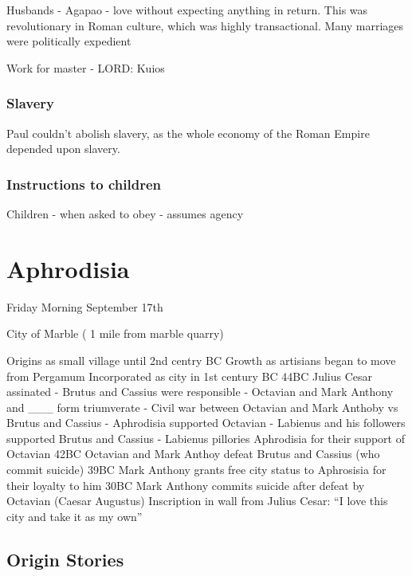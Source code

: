 \documentclass[
]{book}
\begin{document}
Husbands - Agapao - love without expecting anything in return. This was revolutionary in Roman culture, which was highly transactional. Many marriages were politically expedient

Work for master - LORD: Kuios

\hypertarget{slavery}{%
\subsection{Slavery}\label{slavery}}

Paul couldn't abolish slavery, as the whole economy of the Roman Empire depended upon slavery.

\hypertarget{instructions-to-children}{%
\subsection{Instructions to children}\label{instructions-to-children}}

Children - when asked to obey - assumes agency

\hypertarget{aphrodisia}{%
\chapter{Aphrodisia}\label{aphrodisia}}

Friday Morning September 17th

City of Marble ( 1 mile from marble quarry)

Origins as small village until 2nd centry BC
Growth as artisians began to move from Pergamum
Incorporated as city in 1st century BC
44BC Julius Cesar assinated
- Brutus and Cassius were responsible
- Octavian and Mark Anthony and \_\_\_ form triumverate
- Civil war between Octavian and Mark Anthoby vs Brutus and Cassius
- Aphrodisia supported Octavian
- Labienus and his followers supported Brutus and Cassius
- Labienus pillories Aphrodisia for their support of Octavian
42BC Octavian and Mark Anthoy defeat Brutus and Cassius (who commit suicide)
39BC Mark Anthony grants free city status to Aphrosisia for their loyalty to him
30BC Mark Anthony commits suicide after defeat by Octavian (Caesar Augustus)
Inscription in wall from Julius Cesar: ``I love this city and take it as my own''

\hypertarget{origin-stories}{%
\section{Origin Stories}\label{origin-stories}}
\end{document}
